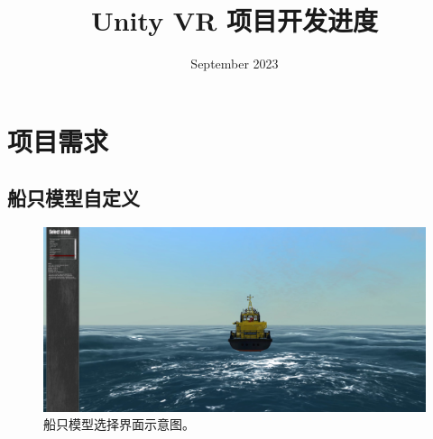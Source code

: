 \documentclass[a4paper,10pt]{article}
\begin{document}
	
	
	\title{\songti {}Unity VR 项目开发进度}
	\date{\textrm{September 2023}}
	\maketitle
	
	\renewcommand{\figurename}{Figure} %
	\renewcommand{\contentsname}{Contents}
	\renewcommand{\tablename}{Table}
	\tableofcontents  %
	
	\section{项目需求}
		
		\subsection{船只模型自定义}
		
		\begin{figure}[htbp]
			\centering				\includegraphics[width=\columnwidth]{picture/Select a ship}
			\caption{
				\label{fig: Select a ship} 
				船只模型选择界面示意图。
			}	
		\end{figure}
		
\end{document}
